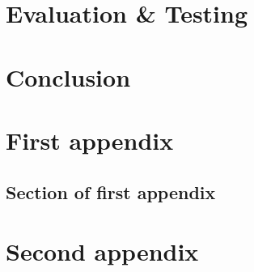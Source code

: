 \documentclass{mproj}
\begin{document}
\chapter{Evaluation \& Testing}\label{testing}

\chapter{Conclusion}\label{conclusion}

\appendix %
\chapter{First appendix}

\section{Section of first appendix}

\chapter{Second appendix}

\printbibliography
\end{document}
